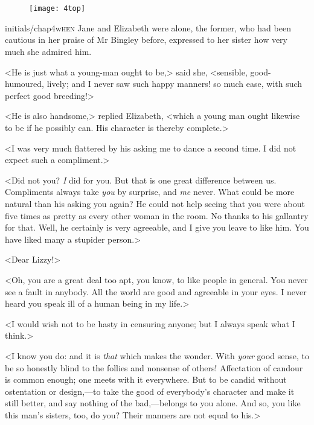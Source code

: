 
\chapter[Chapter \thechapter]{}
\begin{figure}[t!]
\centering
\texttt{[image: 4top]}
\end{figure}

\lettrine[lines=6,image=true]{initials/chap4w}{hen}  Jane and Elizabeth were alone, the former, who had been cautious in her praise of Mr Bingley before, expressed to her sister how very much she admired him.

\zz
<He is just what a young-man ought to be,> said she, <sensible, good-humoured, lively; and I never saw such happy manners! so much ease, with such perfect good breeding!>

<He is also handsome,> replied Elizabeth, <which a young man ought likewise to be if he possibly can. His character is thereby complete.>

<I was very much flattered by his asking me to dance a second time. I did not expect such a compliment.>

<Did not you? \textit{I} did for you. But that is one great difference between us. Compliments always take \textit{you} by surprise, and \textit{me} never. What could be more natural than his asking you again? He could not help seeing that you were about five times as pretty as every other woman in the room. No thanks to his gallantry for that. Well, he certainly is very agreeable, and I give you leave to like him. You have liked many a stupider person.>

<Dear Lizzy!>

<Oh, you are a great deal too apt, you know, to like people in general. You never see a fault in anybody. All the world are good and agreeable in your eyes. I never heard you speak ill of a human being in my life.>

<I would wish not to be hasty in censuring anyone; but I always speak what I think.>

<I know you do: and it is \textit{that} which makes the wonder. With \textit{your} good sense, to be so honestly blind to the follies and nonsense of others! Affectation of candour is common enough; one meets with it everywhere. But to be candid without ostentation or design,—to take the good of everybody's character and make it still better, and say nothing of the bad,—belongs to you alone. And so, you like this man's sisters, too, do you? Their manners are not equal to his.>

